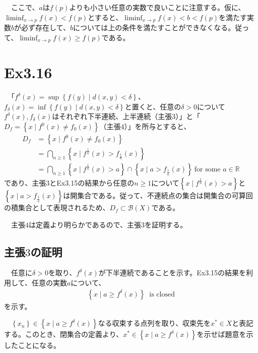 \documentclass{article}
\begin{document}
　ここで、$a$は$f(p)$よりも小さい任意の実数で良いことに注意する。仮に、$\liminf_{x\to p} f(x) < f(p)$とすると、$\liminf_{x\to p} f(x) < b < f(p)$を満たす実数$b$が必ず存在して、$b$については上の条件を満たすことができなくなる。従って、$\liminf_{x\to p} f(x) \geq f(p)$である。

\section{Ex3.16}
　「$f^{\delta}(x) = \sup\left\{ f(y)\mid d(x,y) <\delta \right\}$、$f_{\delta}(x) = \inf\left\{ f(y)\mid d(x,y) <\delta \right\}$と置くと、任意の$\delta > 0$について$f^{\delta}(x), f_{\delta}(x)$はそれぞれ下半連続、上半連続（主張$3$）」と「$D_f = \left\{ x \mid f^0(x) \neq f_0(x)\right\}$（主張$4$）」を所与とすると、
\begin{align*}
	D_f &= \left\{ x \mid f^0(x) \neq f_0(x)\right\}\\
	& = \bigcap_{n\geq 1} \left\{ x \mid f^{\frac{1}{n}}(x) > f_{\frac{1}{n}}(x)\right\}\\
	& = \bigcap_{n\geq 1} \left\{ x \mid f^{\frac{1}{n}}(x) > a\right\} \cap \left\{ x\mid a >  f_{\frac{1}{n}}(x)\right\}\ \text{for some $a\in \mathbb{R}$}
\end{align*}
であり、主張$3$とEx3.15の結果から任意の$n\geq 1$について$\left\{ x \mid f^{\frac{1}{n}}(x) > a\right\}$と$\left\{ x \mid a > f_{\frac{1}{n}}(x) \right\}$は開集合である。従って、不連続点の集合は開集合の可算回の積集合として表現されるため、$D_f \subset \mathcal{B}(X)$である。

　主張$4$は定義より明らかであるので、主張$3$を証明する。

\subsection{主張$3$の証明}
　任意に$\delta > 0$を取り、$f^{\delta}(x)$が下半連続であることを示す。Ex3.15の結果を利用して、任意の実数$a$について、
\begin{align*}
	\left\{ x\mid a \geq f^{\delta}(x) \right\}\ \text{\ is closed}
\end{align*}
を示す。

　$\left\{ x_n \right\} \in \left\{ x\mid a \geq f^{\delta}(x) \right\}$なる収束する点列を取り、収束先を$x^{*}\in X$と表記する。このとき、閉集合の定義より、$x^{*}\in \left\{ x\mid a \geq f^{\delta}(x) \right\}$を示せば題意を示したことになる。
\end{document}
